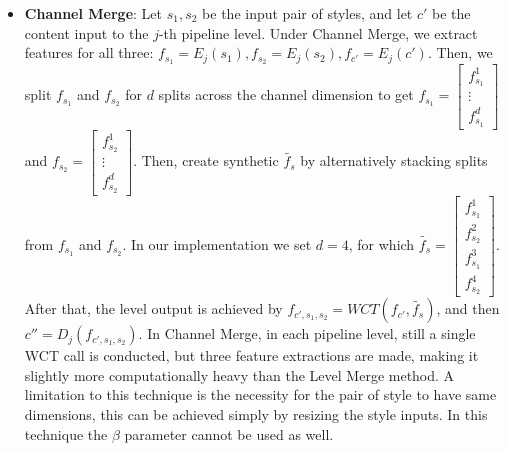 \begin{itemize}
	\item \textbf{Channel Merge}: Let $s_1, s_2$ be the input pair of styles, and let $c'$ be the content input to the $j$-th pipeline level. Under Channel Merge, we extract features for all three: $f_{s_1} = E_j(s_1), f_{s_2} = E_j(s_2), f_{c'} = E_j(c')$. Then, we split $f_{s_1}$ and $f_{s_2}$ for $d$ splits across the channel dimension to get $f_{s_1} = \begin{bmatrix} f_{s_1}^1 \\ \vdots \\ f_{s_1}^d\end{bmatrix}$ and $f_{s_2} = \begin{bmatrix} f_{s_2}^1 \\ \vdots \\ f_{s_2}^d\end{bmatrix}$. Then, create synthetic $\tilde{f_{s}}$ by alternatively stacking splits from $f_{s_1}$ and $f_{s_2}$. In our implementation we set  $d=4$, for which $\tilde{f_{s}} = \begin{bmatrix} f_{s_1}^1 \\  f_{s_2}^2 \\  f_{s_1}^3 \\ f_{s_2}^4\end{bmatrix}$. After that, the level output is achieved by $f_{c',s_1,s_2} = WCT(f_{c'}, \tilde{f_{s}})$, and then $c'' = D_j(f_{c',s_1,s_2})$. In Channel Merge, in each pipeline level, still a single WCT call is conducted, but three feature extractions are made, making it slightly more computationally heavy than the Level Merge method. A limitation to this technique is the necessity for the pair of style to have same dimensions, this can be achieved simply by resizing the style inputs. In this technique the $\beta$ parameter cannot be used as well.
	

\end{itemize}
